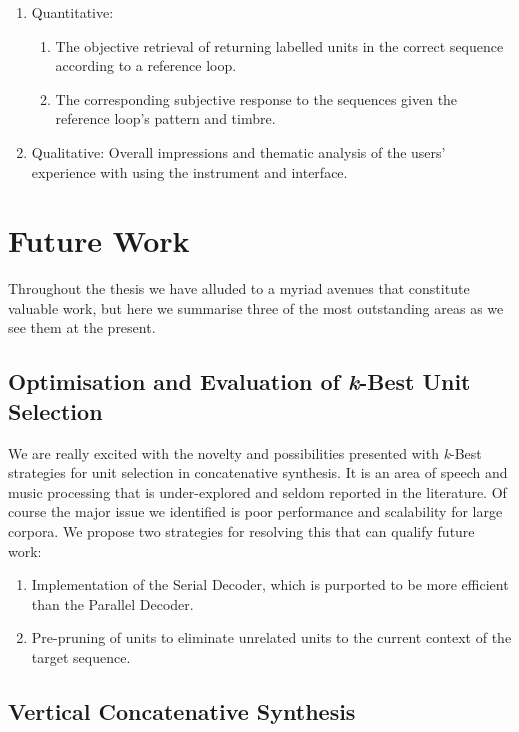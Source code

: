 \begin{enumerate}
  \item Quantitative:
\begin{enumerate}
  \item The objective retrieval of returning labelled units in the correct sequence according to a reference loop.
  \item The corresponding subjective response to the sequences given the reference loop's pattern and timbre.
\end{enumerate}
  \item Qualitative: Overall impressions and thematic analysis of the users' experience with using the instrument and interface.
\end{enumerate}

\section{Future Work}

Throughout the thesis we have alluded to a myriad avenues that constitute valuable work, but here we summarise three of the most outstanding areas as we see them at the present.

\subsection{Optimisation and Evaluation of \textit{k}-Best Unit Selection}

We are really excited with the novelty and possibilities presented with \textit{k}-Best strategies for unit selection in concatenative synthesis. It is an area of speech and music processing that is under-explored and seldom reported in the literature. Of course the major issue we identified is poor performance and scalability for large corpora. We propose two strategies for resolving this that can qualify future work:

\begin{enumerate}
  \item Implementation of the Serial Decoder, which is purported to be more efficient than the Parallel Decoder.
  \item Pre-pruning of units to eliminate unrelated units to the current context of the target sequence. 
\end{enumerate}

\subsection{Vertical Concatenative Synthesis}

